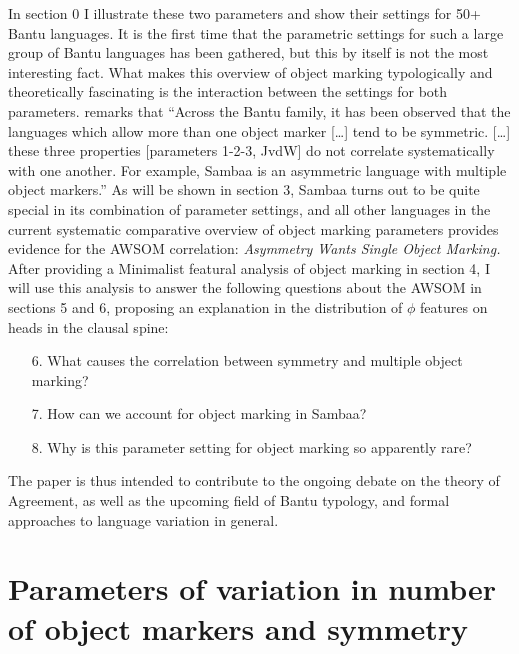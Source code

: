 \documentclass[output=paper
,modfonts
,nonflat]{langsci/langscibook}
\begin{document}
In section 0 I illustrate these two parameters and show their settings for 50+ Bantu languages. It is the first time that the parametric settings for such a large group of Bantu languages has been gathered, but this by itself is not the most interesting fact. What makes this overview of object marking typologically and theoretically fascinating is the interaction between the settings for both parameters. \citet[78]{Riedel2009} remarks that “Across the Bantu family, it has been observed that the languages which allow more than one object marker […] tend to be symmetric. […] these three properties [parameters 1-2-3, JvdW] do not correlate systematically with one another. For example, Sambaa is an asymmetric language with multiple object markers.” As will be shown in section 3, Sambaa turns out to be quite special in its combination of parameter settings, and all other languages in the current systematic comparative overview of object marking parameters provides evidence for the AWSOM correlation: \textit{Asymmetry Wants Single Object Marking.} After providing a Minimalist featural analysis of object marking in section 4, I will use this analysis to answer the following questions about the AWSOM in sections 5 and 6, proposing an explanation in the distribution of $\phi$ features on heads in the clausal spine:
\begin{enumerate}
\item[6.]What causes the correlation between symmetry and multiple object marking?
\item[7.]How can we account for object marking in Sambaa?
\item[8.]Why is this parameter setting for object marking so apparently rare?
\end{enumerate}
The paper is thus intended to contribute to the ongoing debate on the theory of Agreement, as well as the upcoming field of Bantu typology, and formal approaches to language variation in general.

\section{Parameters of variation in number of object markers and symmetry}
\end{document}
